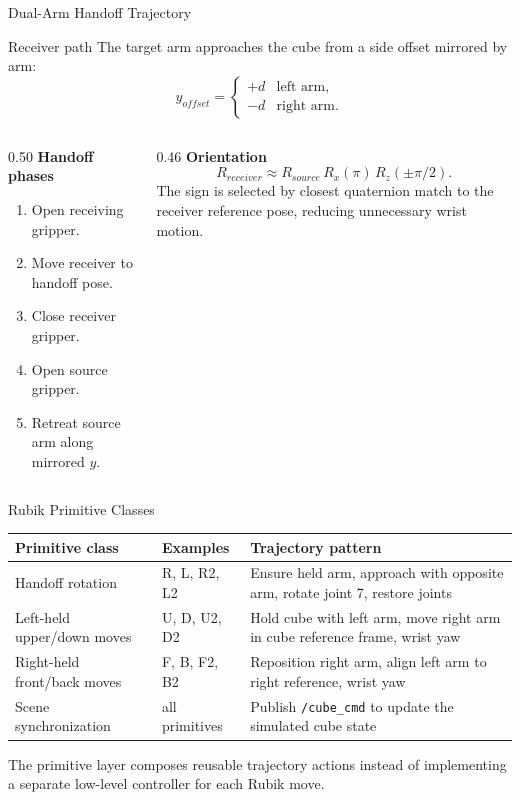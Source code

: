 \documentclass[10pt,aspectratio=169]{beamer}
\begin{document}
\begin{frame}{Dual-Arm Handoff Trajectory}
  \begin{block}{Receiver path}
    The target arm approaches the cube from a side offset mirrored by arm:
    \[
      y_{offset} =
      \begin{cases}
        +d & \text{left arm},\\
        -d & \text{right arm}.
      \end{cases}
    \]
  \end{block}

  \begin{columns}[T]
    \begin{column}{0.50\textwidth}
      \textbf{Handoff phases}
      \begin{enumerate}
        \item Open receiving gripper.
        \item Move receiver to handoff pose.
        \item Close receiver gripper.
        \item Open source gripper.
        \item Retreat source arm along mirrored $y$.
      \end{enumerate}
    \end{column}
    \begin{column}{0.46\textwidth}
      \textbf{Orientation}
      \[
        R_{receiver} \approx
        R_{source}\,R_x(\pi)\,R_z(\pm \pi/2).
      \]
      The sign is selected by closest quaternion match to the receiver reference pose, reducing unnecessary wrist motion.
    \end{column}
  \end{columns}
\end{frame}

\begin{frame}{Rubik Primitive Classes}
  \begin{table}
    \centering
    \small
    \begin{tabular}{p{}p{}p{}}
      \toprule
      Primitive class & Examples & Trajectory pattern \\
      \midrule
      Handoff rotation & R, L, R2, L2 & Ensure held arm, approach with opposite arm, rotate joint 7, restore joints \\
      Left-held upper/down moves & U, D, U2, D2 & Hold cube with left arm, move right arm in cube reference frame, wrist yaw \\
      Right-held front/back moves & F, B, F2, B2 & Reposition right arm, align left arm to right reference, wrist yaw \\
      Scene synchronization & all primitives & Publish \texttt{/cube\_cmd} to update the simulated cube state \\
      \bottomrule
    \end{tabular}
  \end{table}

  \vspace{0.15cm}
  The primitive layer composes reusable trajectory actions instead of implementing a separate low-level controller for each Rubik move.
\end{frame}
\end{document}
